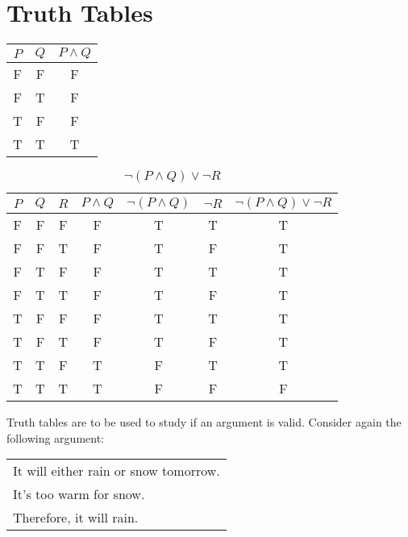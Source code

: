 \section{Truth Tables}

\begin{center}
 \begin{tabular}{|c|c|c|}
   \hline
   $P$ & $Q$ & $P \land Q$\\
   \hline
   F & F & F\\
   F & T & F\\
   T & F & F\\
   T & T & T\\
   \hline
 \end{tabular}
 \label{tab:P_and_Q}
\end{center}



\sol 
\begin{table}[h]
  \centering
  \label{tab:not_(P_and_Q)_or_not_R }
  \begin{tabular}{|c|c|c|c|c|c|c|}
    \hline
    $P$ & $Q$ & $R$ & $P \land Q$ & $\neg (P \land Q)$ & $\neg R$ & $\neg (P \land Q) \lor \neg R$\\
    \hline 
    F & F & F & F & T & T & T\\      
    F & F & T & F & T & F & T\\
    F & T & F & F & T & T & T\\
    F & T & T & F & T & F & T\\
    T & F & F & F & T & T & T\\
    T & F & T & F & T & F & T\\
    T & T & F & T & F & T & T\\ 
    T & T & T & T & F & F & F\\
    \hline
  \end{tabular}
  \caption{$\neg (P \land Q) \lor \neg R$}
\end{table}

Truth tables are to be used to study if an argument is valid.
Consider again the following argument:

\begin{tabular}{l}
It will either rain or snow tomorrow.\\
It's too warm for snow.\\
Therefore, it will rain.\\
\end{tabular}

